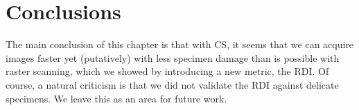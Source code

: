 \documentclass[twocolumn,oneside]{IEEEtran/IEEEtran}
\begin{document}
\section{Conclusions}\label{sec:conclusions}
The main conclusion of this chapter is that with CS, it seems that we
can acquire images faster yet (putatively) with less specimen damage
than is possible with raster scanning, which we showed by introducing
a new metric, the RDI. Of course, a natural criticism is that we did
not validate the RDI against delicate specimens. We leave this as an
area for future work.








\end{document}
